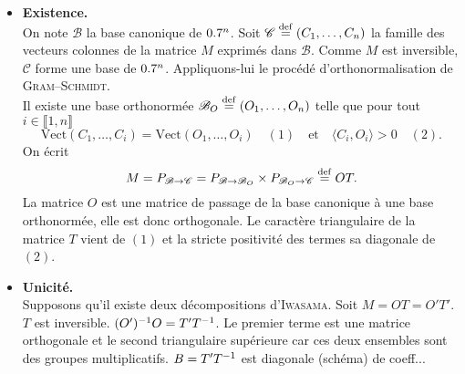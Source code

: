 \begin{preuve}
    \begin{itemize}
        \item \textbf{Existence.} \\
        On note $\mathscr{B}$ la base canonique de $0.7^n$. Soit $\mathscr{C} \overset{\mathrm{\tiny def}}{=} (C_1, \dots, C_n)$ la famille des vecteurs colonnes de la matrice $M$ exprimés dans $\mathscr{B}$. Comme $M$ est inversible, $\mathscr{C}$ forme une base de $0.7^n$. Appliquons-lui le procédé d'orthonormalisation de \textsc{Gram}--\textsc{Schmidt}. \\
        Il existe une base orthonormée $\mathscr{B}_O \overset{\mathrm{\tiny def}}{=} (O_1, \dots, O_n)$ telle que pour tout $i \in \llbracket 1, n \rrbracket$
        $$\mathrm{Vect}(C_1, \dots, C_i) = \mathrm{Vect}(O_1,\dots, O_i) \quad (1) \quad \text{et} \quad \langle C_i, O_i \rangle > 0 \quad (2).$$
        On écrit 
        $$M = P_{\mathscr{B} \to \mathscr{C}} = P_{\mathscr{B} \to \mathscr{B}_O} \times P_{\mathscr{B}_O \to \mathscr{C}} \overset{\mathrm{\tiny def}}{=} OT.$$
        La matrice $O$ est une matrice de passage de la base canonique à une base orthonormée, elle est donc orthogonale. 
        Le caractère triangulaire de la matrice $T$ vient de $(1)$ et la stricte positivité des termes sa diagonale de $(2)$.
        \item \textbf{Unicité.} \\
        Supposons qu'il existe deux décompositions d'\textsc{Iwasama}.
        Soit $M = OT = O'T'$. $T$ est inversible. $(O')^{-1}O =T'T^{-1}$. Le premier terme est une matrice orthogonale et le second triangulaire supérieure car ces deux ensembles sont des groupes multiplicatifs. $B = T'T^{-1}$ est diagonale (schéma) de coeff...
    \end{itemize} 
\end{preuve}
